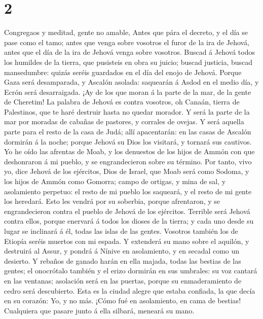 \hypertarget{section-1}{%
\section{2}\label{section-1}}

 Congregaos y meditad, gente no amable,  Antes
que pára el decreto, y el día se pase como el tamo; antes que venga
sobre vosotros el furor de la ira de Jehová, antes que el día de la ira
de Jehová venga sobre vosotros.  Buscad á Jehová todos los
humildes de la tierra, que pusisteis en obra su juicio; buscad justicia,
buscad mansedumbre: quizás seréis guardados en el día del enojo de
Jehová.  Porque Gaza será desamparada, y Ascalón asolada:
saquearán á Asdod en el medio día, y Ecrón será desarraigada.
 ¡Ay de los que moran á la parte de la mar, de la gente de
Cheretim! La palabra de Jehová es contra vosotros, oh Canaán, tierra de
Palestinos, que te haré destruir hasta no quedar morador.  Y
será la parte de la mar por moradas de cabañas de pastores, y corrales
de ovejas.  Y será aquella parte para el resto de la casa de
Judá; allí apacentarán: en las casas de Ascalón dormirán á la noche;
porque Jehová su Dios los visitará, y tornará sus cautivos. 
Yo he oído las afrentas de Moab, y los denuestos de los hijos de Ammón
con que deshonraron á mi pueblo, y se engrandecieron sobre su término.
 Por tanto, vivo yo, dice Jehová de los ejércitos, Dios de
Israel, que Moab será como Sodoma, y los hijos de Ammón como Gomorra;
campo de ortigas, y mina de sal, y asolamiento perpetuo: el resto de mi
pueblo los saqueará, y el resto de mi gente los heredará. 
Esto les vendrá por su soberbia, porque afrentaron, y se engrandecieron
contra el pueblo de Jehová de los ejércitos.  Terrible será
Jehová contra ellos, porque enervará á todos los dioses de la tierra; y
cada uno desde su lugar se inclinará á él, todas las islas de las
gentes.  Vosotros también los de Etiopía seréis muertos con
mi espada.  Y extenderá su mano sobre el aquilón, y
destruirá al Assur, y pondrá á Nínive en asolamiento, y en secadal como
un desierto.  Y rebaños de ganado harán en ella majada,
todas las bestias de las gentes; el onocrótalo también y el erizo
dormirán en sus umbrales: su voz cantará en las ventanas; asolación será
en las puertas, porque su enmaderamiento de cedro será descubierto.
 Esta es la ciudad alegre que estaba confiada, la que decía
en su corazón: Yo, y no más. ¡Cómo fué en asolamiento, en cama de
bestias! Cualquiera que pasare junto á ella silbará, meneará su mano.

